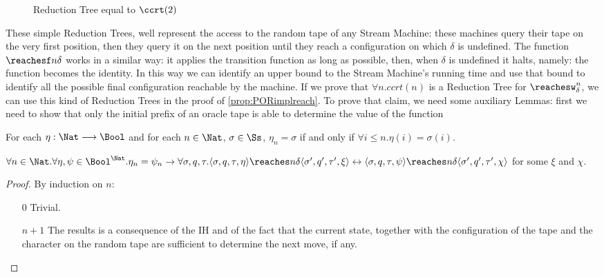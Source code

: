 \begin{conditional}{\notappendix}
\begin{figure}[]
      \caption{Reduction Tree equal to $\ccrt(2)$}
      \label{fig:ccrt2}
    \end{figure}


    These simple Reduction Trees, well represent the access to the random tape of
    any Stream Machine: these machines query their tape on the very first position,
    then they query it on the next position until they reach a configuration on which
    $\delta$ is undefined.
    The function $\reachesf n \delta$ works in a similar
    way: it applies the transition function as long as possible, then, when
    $\delta$ is undefined it halts, namely: the function becomes the identity.
    In this way we can identify an upper bound to the
    Stream Machine's running time and use that bound to identify all the
    possible final configuration reachable by the machine.
    If we prove that $\forall n. ccrt(n)$ is a Reduction Tree for
    $\reachesw^n_\delta$, we can use this kind of Reduction Trees in the proof of
    \ref{prop:PORimplreach}.
    To prove that claim, we need some auxiliary Lemmas: first we need to show that
    only the initial prefix of an oracle tape is able to determine the value
    of the function

    \begin{defn}
      For each $\eta: \Nat \longrightarrow \Bool$ and for each $n \in \Nat$,
      $\sigma \in \Ss$,
      $\eta_n=\sigma$ if and only if $\forall i \le n. \eta(i)=\sigma(i)$.
    \end{defn}

    \begin{lemma}
      \label{lemma:SFPidonprefix}
      $\forall n \in \Nat.
      \forall \eta, \psi \in \Bool^\Nat. \eta_n=\psi_n \to \forall \sigma, q, \tau.
      \langle \sigma , q, \tau, \eta\rangle \reaches n \delta
      \langle \sigma' , q', \tau', \xi\rangle \leftrightarrow
      \langle \sigma , q, \tau, \psi\rangle \reaches n \delta
      \langle \sigma' , q', \tau', \chi\rangle$ for some $\xi$ and $\chi$.
    \end{lemma}
    \begin{proof}
      By induction on $n$:
      \begin{itemize}
        \item [$0$] Trivial.
        \item [$n+1$] The results is a consequence of the IH
        and of the fact that the current state, together with the configuration
        of the tape and the character on the random tape are sufficient to
        determine the next move, if any.
      \end{itemize}
    \end{proof}


\end{conditional}

